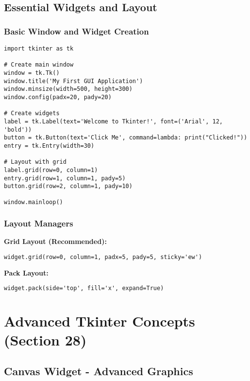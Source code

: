 \documentclass[12pt,a4paper]{article}
\begin{document}
\subsection{Essential Widgets and Layout}

\subsubsection{Basic Window and Widget Creation}

\begin{tcolorbox}[colback=purple!5!white,colframe=purple!75!black,title=Basic GUI Setup]
\begin{lstlisting}
import tkinter as tk

# Create main window
window = tk.Tk()
window.title('My First GUI Application')
window.minsize(width=500, height=300)
window.config(padx=20, pady=20)

# Create widgets
label = tk.Label(text='Welcome to Tkinter!', font=('Arial', 12, 'bold'))
button = tk.Button(text='Click Me', command=lambda: print("Clicked!"))
entry = tk.Entry(width=30)

# Layout with grid
label.grid(row=0, column=1)
entry.grid(row=1, column=1, pady=5)
button.grid(row=2, column=1, pady=10)

window.mainloop()
\end{lstlisting}
\end{tcolorbox}

\subsubsection{Layout Managers}

\textbf{Grid Layout (Recommended):}
\begin{lstlisting}
widget.grid(row=0, column=1, padx=5, pady=5, sticky='ew')
\end{lstlisting}

\textbf{Pack Layout:}
\begin{lstlisting}
widget.pack(side='top', fill='x', expand=True)
\end{lstlisting}

\section{Advanced Tkinter Concepts (Section 28)}

\subsection{Canvas Widget - Advanced Graphics}
\end{document}
